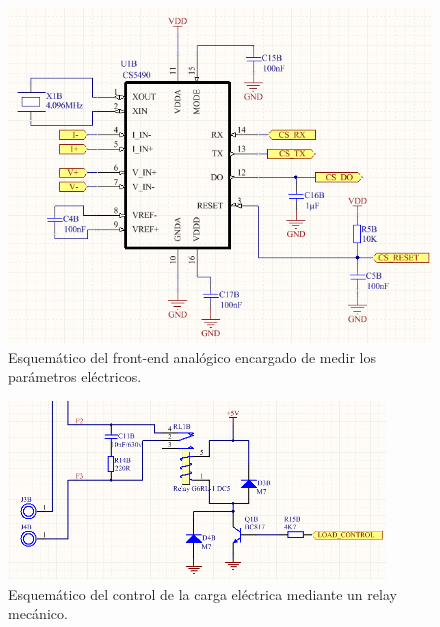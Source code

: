 \begin{figure}[h]
	\centering
	\includegraphics[width=14cm]{./Figures/3_1_2_pcb_medicion_energia.png}
	\caption{Esquemático del front-end analógico encargado de medir los parámetros eléctricos.}
	\label{fig:pcb_medicion_energia}
\end{figure}

\begin{figure}[h]
	\centering
	\includegraphics[width=10cm]{./Figures/3_1_2_pcb_control_carga.png}
	\caption{Esquemático del control de la carga eléctrica mediante un relay mecánico.}
	\label{fig:pcb_control_carga}
\end{figure}

